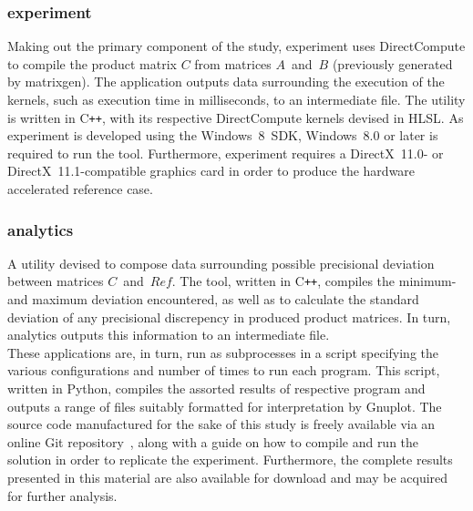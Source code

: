 \subsubsection{experiment}
Making out the primary component of the study, experiment uses DirectCompute to compile the product matrix $C$ from matrices $A$~and~$B$ (previously generated by matrixgen).
The application outputs data surrounding the execution of the kernels, such as execution time in milliseconds, to an intermediate file.
The utility is written in C\texttt{++}, with its respective DirectCompute kernels devised in HLSL.
As experiment is developed using the Windows~8~SDK, Windows~8.0 or later is required to run the tool.
Furthermore, experiment requires a DirectX~11.0- or DirectX~11.1-compatible graphics card in order to produce the hardware accelerated reference case.

\subsubsection{analytics}
A utility devised to compose data surrounding possible precisional deviation between matrices $C$~and~$Ref$.
The tool, written in C\texttt{++}, compiles the minimum- and maximum  deviation encountered, as well as to calculate the standard deviation of any precisional discrepency in produced product matrices.
In turn, analytics outputs this information to an intermediate file.\\

These applications are, in turn, run as subprocesses in a script specifying the various configurations and number of times to run each program.
This script, written in Python, compiles the assorted results of respective program and outputs a range of files suitably formatted for interpretation by Gnuplot.
The source code manufactured for the sake of this study is freely available via an online Git repository~, along with a guide on how to compile and run the solution in order to replicate the experiment.
Furthermore, the complete results presented in this material are also available for download and may be acquired for further analysis.

\newcommand\ah[2]{\tikz[remember picture,baseline]\node[inner sep=2pt,outer sep=0](#1){#2};}
\newcommand\arrow[2]{%
\begin{tikzpicture}[remember picture, overlay, >=stealth, shift={(0,0)}]
\draw[->] (#1) to (#2);
\end{tikzpicture}%
}

